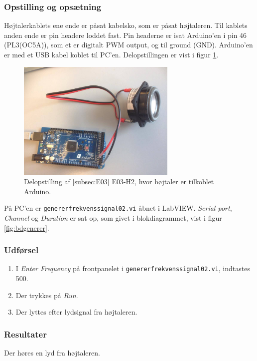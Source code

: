 		\subsubsection{Opstilling og opsætning}
		Højtalerkablets ene ende er påsat kabelsko, som er påsat højtaleren. Til kablets anden ende er pin headere loddet fast. Pin headerne er isat Arduino'en i pin 46 (PL3(OC5A)), som et er digitalt PWM output, og til ground (GND). 
		Arduino'en er med et USB kabel koblet til PC'en. Delopstillingen er vist i figur \ref{fig:tores}.\\ 
	  
			\begin{figure}[htb]
			\centering
				\includegraphics[width=3in]{hbArduino}
				\caption{Delopstilling af \ref{subsec:E03} E03-H2, hvor højtaler er tilkoblet Arduino.}	
				\label{fig:tores}
			\end{figure}
	  
		På PC'en er \texttt{genererfrekvenssignal02.vi} åbnet i LabVIEW. \textit{Serial port}, \textit{Channel} og \textit{Duration} er sat op, som givet i blokdiagrammet, vist i figur \ref{fig:bdgenerer}.   \\   
	
	\subsubsection{Udførsel}
			\begin{enumerate} 
				\item I \textit{Enter Frequency} på frontpanelet i \texttt{genererfrekvenssignal02.vi}, indtastes 500. 
				\item Der trykkes på \textit{Run}. 
				\item Der lyttes efter lydsignal fra højtaleren.  
			\end{enumerate}
			
		\subsubsection{Resultater}
		Der høres en lyd fra højtaleren. 
